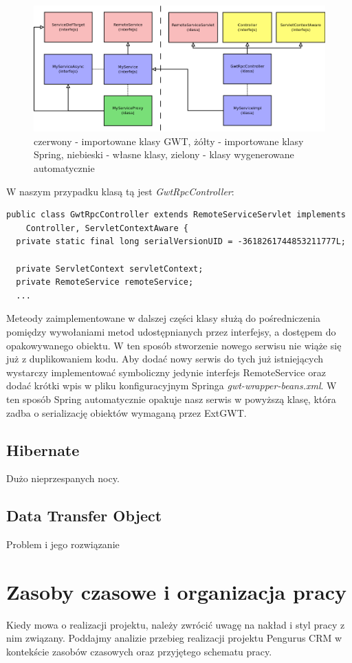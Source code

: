 \documentclass[licencjacka]{pracamgr}
\begin{document}
\begin{figure}[h!]
\centering
\includegraphics[width=\textwidth]{resources/gwt_spring_2.png}
\caption{czerwony - importowane klasy GWT, żółty - importowane klasy Spring, niebieski - własne klasy, zielony - klasy wygenerowane automatycznie}
\end{figure}

W naszym przypadku klasą tą jest \textit{GwtRpcController}: 
\begin{verbatim}
public class GwtRpcController extends RemoteServiceServlet implements
    Controller, ServletContextAware {
  private static final long serialVersionUID = -3618261744853211777L;
          
  private ServletContext servletContext;
  private RemoteService remoteService;
  ...
\end{verbatim}
Meteody zaimplementowane w dalszej części klasy służą do pośredniczenia pomiędzy wywołaniami metod udostępnianych przez interfejsy, a dostępem do opakowywanego obiektu. W ten sposób stworzenie nowego serwisu nie wiąże się już z duplikowaniem kodu. Aby dodać nowy serwis do tych już istniejących wystarczy implementować symboliczny jedynie interfejs RemoteService oraz dodać krótki wpis w pliku konfiguracyjnym Springa \textit{gwt-wrapper-beans.xml}. W ten sposób Spring automatycznie opakuje nasz serwis w powyższą klasę, która zadba o serializację obiektów wymaganą przez ExtGWT. 

\subsection{Hibernate}
Dużo nieprzespanych nocy.
\subsection{Data Transfer Object}
Problem i jego rozwiązanie
\section{Zasoby czasowe i organizacja pracy}
Kiedy mowa o realizacji projektu, należy zwrócić uwagę na nakład i styl pracy z nim związany. 
Poddajmy analizie przebieg realizacji projektu Pengurus CRM w kontekście zasobów czasowych oraz przyjętego schematu pracy.\\
\end{document}
